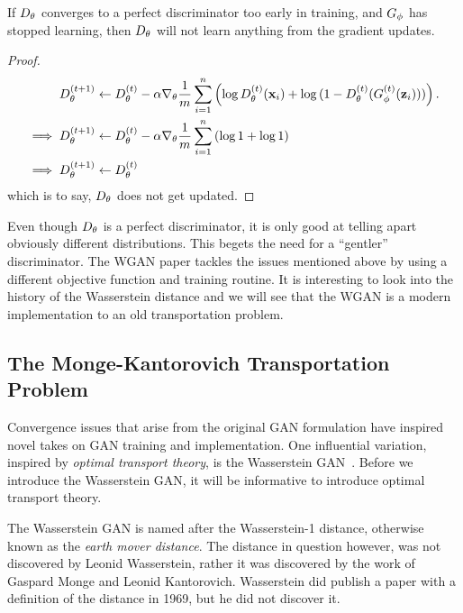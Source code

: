 \begin{theorem}%
  \label{thm:too-early}
  If $D_\theta$ converges to a perfect discriminator too early in training,
  and $G_\phi$ has stopped learning, then $D_\theta$ will not learn anything
  from the gradient updates.
\end{theorem}

\begin{proof}
  \begin{align}
    \label{eq:d-updates-no-good}
    D_\theta^{(t+1)} & \gets D_\theta^{(t)} - \alpha \nabla_\theta {1 \over m}
                 \sum_{i=1}^n \left( \log D^{(t)}_\theta(\mathbf{x}_i)
                 + \log{(1 - D^{(t)}_\theta(G^{(t)}_\phi(\mathbf{z}_i)))} \right). \\
    \implies D_\theta^{(t+1)} & \gets D_\theta^{(t)} - \alpha\nabla_\theta {1 \over m} \sum_{i=1}^n \left( \log{1} + \log{1} \right) \\
    \implies D_\theta^{(t+1)} & \gets D_\theta^{(t)}
  \end{align} which is to say, $D_\theta$ does not get updated.
\end{proof}

Even though $D_\theta$ is a perfect discriminator, it is only good at
telling apart obviously different distributions. This begets the need
for a ``gentler'' discriminator.  The WGAN paper tackles the issues
mentioned above by using a different objective function and training
routine.  It is interesting to look into the history of the
Wasserstein distance and we will see that the WGAN is a modern
implementation to an old transportation problem.

\subsection{The Monge-Kantorovich Transportation Problem}

Convergence issues that arise from the original GAN formulation have
inspired novel takes on GAN training and implementation. One
influential variation, inspired by \textit{optimal transport theory},
is the Wasserstein GAN~\cite{ref:arjovsky-2017}. Before we introduce
the Wasserstein GAN, it will be informative to introduce optimal
transport theory.

The Wasserstein GAN is named after the Wasserstein-1 distance,
otherwise known as the \textit{earth mover distance}. The distance in
question however, was not discovered by Leonid Wasserstein, rather it
was discovered by the work of Gaspard Monge and Leonid
Kantorovich. Wasserstein did publish a paper with a definition of the
distance in 1969, but he did not discover it.


